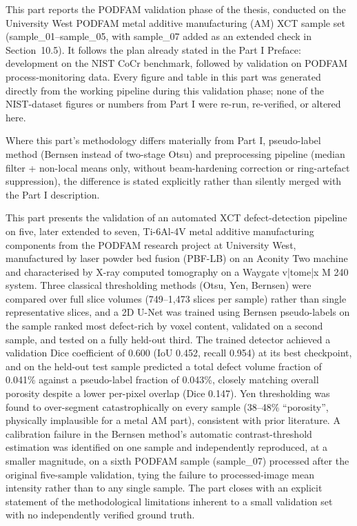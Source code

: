 
This part reports the PODFAM validation phase of the thesis, conducted on the University West
PODFAM metal additive manufacturing (AM) XCT sample set (sample\_01--sample\_05, with sample\_07
added as an extended check in Section~10.5). It follows the plan already stated in the Part I
Preface: development on the NIST CoCr benchmark, followed by validation on PODFAM
process-monitoring data. Every figure and table in this part was generated directly from the working
pipeline during this validation phase; none of the NIST-dataset figures or numbers from Part I were
re-run, re-verified, or altered here.

Where this part's methodology differs materially from Part I, pseudo-label method (Bernsen instead
of two-stage Otsu) and preprocessing pipeline (median filter + non-local means only, without
beam-hardening correction or ring-artefact suppression), the difference is stated explicitly rather
than silently merged with the Part I description.

This part presents the validation of an automated XCT defect-detection pipeline on five, later
extended to seven, Ti-6Al-4V metal additive manufacturing components from the PODFAM research
project at University West, manufactured by laser powder bed fusion (PBF-LB) on an Aconity Two
machine and characterised by X-ray computed tomography on a Waygate v|tome|x M 240 system. Three
classical thresholding methods (Otsu, Yen, Bernsen) were compared over full slice volumes
(749--1,473 slices per sample) rather than single representative slices, and a 2D U-Net was trained
using Bernsen pseudo-labels on the sample ranked most defect-rich by voxel content, validated on a
second sample, and tested on a fully held-out third. The trained detector achieved a validation Dice
coefficient of 0.600 (IoU 0.452, recall 0.954) at its best checkpoint, and on the held-out test
sample predicted a total defect volume fraction of 0.041\% against a pseudo-label fraction of
0.043\%, closely matching overall porosity despite a lower per-pixel overlap (Dice 0.147). Yen
thresholding was found to over-segment catastrophically on every sample (38--48\% ``porosity'',
physically implausible for a metal AM part), consistent with prior literature. A calibration failure
in the Bernsen method's automatic contrast-threshold estimation was identified on one sample and
independently reproduced, at a smaller magnitude, on a sixth PODFAM sample (sample\_07) processed
after the original five-sample validation, tying the failure to processed-image mean intensity
rather than to any single sample. The part closes with an explicit statement of the methodological
limitations inherent to a small validation set with no independently verified ground truth.


